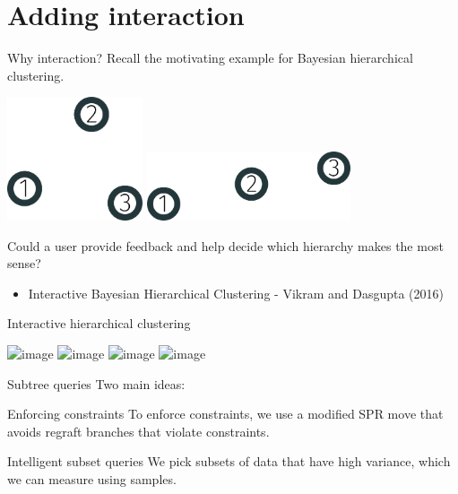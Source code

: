 \documentclass[10pt, compress]{beamer}
\begin{document}
\section{Adding interaction}

\begin{frame}{Why interaction?}
  Recall the motivating example for Bayesian hierarchical clustering.
  \begin{center}
  \includegraphics[width=0.3\textwidth]{img/3-cluster}\hfill
  \includegraphics[width=0.45\textwidth]{img/3-cluster-line}
  \end{center}
  Could a user provide feedback and help decide which hierarchy
  makes the most sense?
  \begin{itemize}
    \item Interactive Bayesian Hierarchical Clustering - Vikram and Dasgupta (2016) \cite{Vikram2016}
  \end{itemize}
\end{frame}

\begin{frame}{Interactive hierarchical clustering}
  \begin{center}
    \includegraphics<1>[width=\textwidth]{img/interaction-0}
    \includegraphics<2>[width=\textwidth]{img/interaction-1}
    \includegraphics<3>[width=\textwidth]{img/interaction-2}
    \includegraphics<4>[width=\textwidth]{img/interaction-3}
  \end{center}
\end{frame}

\begin{frame}{Subtree queries}
  Two main ideas:
  \pause
  \begin{block}{Enforcing constraints}
    To enforce constraints, we use
    a modified SPR move that avoids
    regraft branches that violate constraints.
  \end{block}
  \pause
  \begin{block}{Intelligent subset queries}
    We pick subsets of data that have high variance,
    which we can measure using samples.
  \end{block}
\end{frame}
\end{document}
